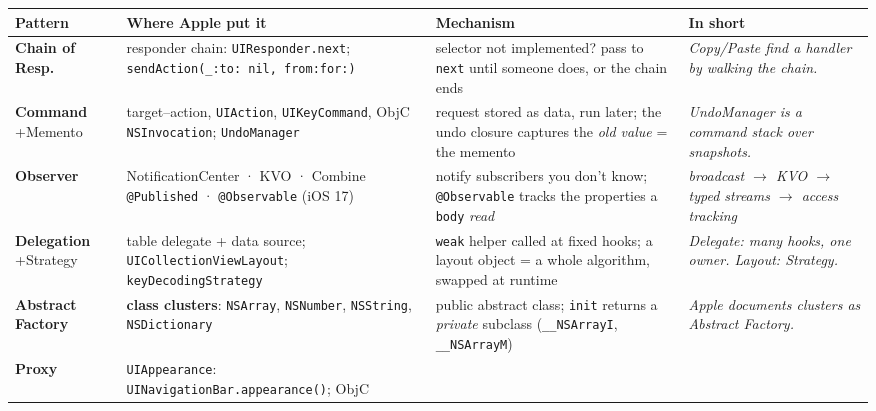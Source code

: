 \documentclass[8pt]{extarticle}
\newcommand\say[1]{\textcolor{sheetBlue}{\emph{#1}}}
\begin{document}


\vspace{2pt}
{\footnotesize\setlength\tabcolsep{3pt}\renewcommand{\arraystretch}{1.0}
\noindent\begin{tabularx}{\linewidth}{@{}L{16mm}L{50mm}L{53mm}X@{}}
\toprule
\textbf{Pattern} & \textbf{Where Apple put it} & \textbf{Mechanism} & \textbf{In short} \\
\midrule
\textbf{Chain of Resp.} & responder chain: \texttt{UIResponder.next};
\texttt{sendAction(\_:to: nil, from:for:)} & selector not implemented? pass to \texttt{next}
until someone does, or the chain ends & \say{Copy/Paste find a handler by walking the chain.} \\
\textbf{Command} +Memento & target–action, \texttt{UIAction}, \texttt{UIKeyCommand}, ObjC
\texttt{NSInvocation}; \texttt{UndoManager} & request stored as data, run later; the undo closure
captures the \emph{old value} = the memento & \say{UndoManager is a command stack over
snapshots.} \\
\textbf{Observer} & NotificationCenter · KVO · Combine \texttt{@Published} · \texttt{@Observable}
(iOS 17) & notify subscribers you don't know; \texttt{@Observable} tracks the properties a
\texttt{body} \emph{read} & \say{broadcast $\to$ KVO $\to$ typed streams $\to$ access tracking} \\
\textbf{Delegation} +Strategy & table delegate + data source; \texttt{UICollectionViewLayout};
\texttt{keyDecodingStrategy} &
\texttt{weak} helper called at fixed hooks; a layout object = a whole algorithm, swapped at
runtime & \say{Delegate: many hooks, one owner. Layout: Strategy.} \\
\textbf{Abstract Factory} & \textbf{class clusters}: \texttt{NSArray}, \texttt{NSNumber},
\texttt{NSString}, \texttt{NSDictionary} & public abstract class; \texttt{init} returns a
\emph{private} subclass (\texttt{\_\_NSArrayI}, \texttt{\_\_NSArrayM}) & \say{Apple documents
clusters as Abstract Factory.} \\
\textbf{Proxy} & \texttt{UIAppearance}: \texttt{UINavigationBar.appearance()}; ObjC

\end{tabularx}}
\end{document}
